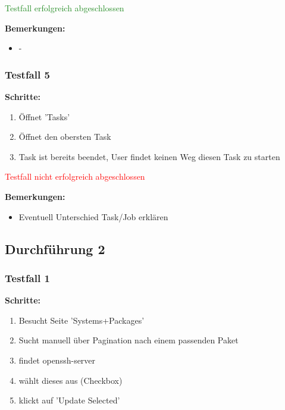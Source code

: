 {\textcolor{ForestGreen}{Testfall erfolgreich abgeschlossen}

\bigskip
\textbf{Bemerkungen:}

\begin{itemize}[noitemsep,nolistsep]
    \item -
\end{itemize}

\subsubsection*{Testfall 5}

\textbf{Schritte:}

\begin{enumerate}
    \item Öffnet 'Tasks'
    \item Öffnet den obersten Task
    \item Task ist bereits beendet, User findet keinen Weg diesen Task zu starten
\end{enumerate}

\textcolor{Red}{Testfall nicht erfolgreich abgeschlossen}

\bigskip
\textbf{Bemerkungen:}

\begin{itemize}[noitemsep,nolistsep]
    \item Eventuell Unterschied Task/Job erklären
\end{itemize}



\subsection*{Durchführung 2}

\subsubsection*{Testfall 1}

\textbf{Schritte:}

\begin{enumerate}
    \item Besucht Seite 'Systems+Packages'
    \item Sucht manuell über Pagination nach einem passenden Paket
    \item findet openssh-server
    \item wählt dieses aus (Checkbox)
    \item klickt auf 'Update Selected'
\end{enumerate}

}
